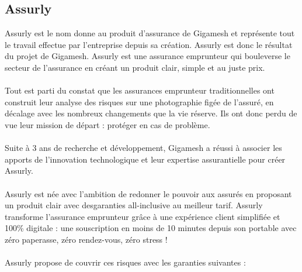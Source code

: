 \subsection{Assurly}
Assurly est le nom donne au produit d’assurance de Gigamesh  et représente tout le travail effectue par l’entreprise depuis sa création. Assurly est donc le résultat du projet de Gigamesh. Assurly est une assurance emprunteur qui bouleverse le secteur de l’assurance en créant un produit clair, simple et au juste prix. \\ \\Tout est parti du constat que les assurances emprunteur traditionnelles ont construit leur analyse des risques sur une photographie figée de l’assuré, en décalage avec les nombreux changements que la vie réserve. Ils ont donc perdu de vue leur mission de départ : protéger en cas de problème.\\ \\ Suite à 3 ans de recherche et développement, Gigamesh a réussi à associer les apports de l’innovation technologique et leur expertise assurantielle pour créer Assurly.\\ \\Assurly est née avec l’ambition de redonner le pouvoir aux assurés en proposant un produit clair avec desgaranties all-inclusive au meilleur tarif. Assurly transforme l’assurance emprunteur grâce à une expérience client simplifiée et 100\% digitale : une souscription en moins de 10 minutes depuis son portable avec zéro paperasse, zéro rendez-vous, zéro stress !\\ \\Assurly propose de couvrir ces risques avec les garanties suivantes :

